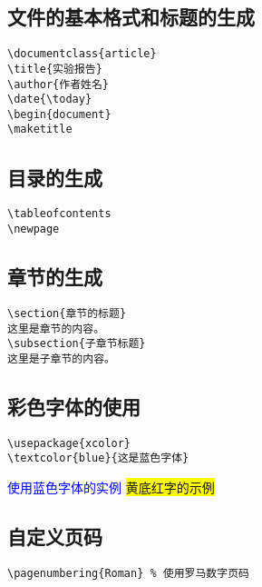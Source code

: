 \documentclass[a4paper, 12pt]{article}
\begin{document}
\subsection{文件的基本格式和标题的生成}
 \begin{verbatim}
\documentclass{article}
\title{实验报告}
\author{作者姓名}
\date{\today}
\begin{document}
\maketitle
  \end{verbatim}
  
\subsection{目录的生成}
   \begin{verbatim}
\tableofcontents
\newpage
  \end{verbatim}
  
\subsection{章节的生成}
\begin{verbatim}
\section{章节的标题}
这里是章节的内容。
\subsection{子章节标题}
这里是子章节的内容。
  \end{verbatim}
  
\subsection{彩色字体的使用}
 \begin{verbatim}
\usepackage{xcolor}
\textcolor{blue}{这是蓝色字体}
  \end{verbatim}
  

\textcolor{blue}{使用蓝色字体的实例}
\colorbox{yellow}{\color{red}黄底红字的示例}

\subsection{自定义页码}
\begin{verbatim}
\pagenumbering{Roman} % 使用罗马数字页码
  \end{verbatim}
  
\end{document}
